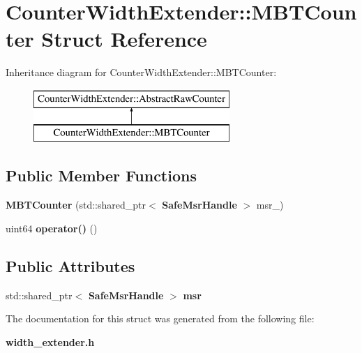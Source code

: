 \section{Counter\+Width\+Extender\+:\+:M\+B\+T\+Counter Struct Reference}
\label{structCounterWidthExtender_1_1MBTCounter}
Inheritance diagram for Counter\+Width\+Extender\+:\+:M\+B\+T\+Counter\+:\begin{figure}[H]
\begin{center}
\leavevmode
\includegraphics[height=2.000000cm]{structCounterWidthExtender_1_1MBTCounter}
\end{center}
\end{figure}
\subsection*{Public Member Functions}
\begin{DoxyCompactItemize}
\item 
\mbox{\label{structCounterWidthExtender_1_1MBTCounter_a68bea99ee05808321fb3422831e816e4}} 
{\bfseries M\+B\+T\+Counter} (std\+::shared\+\_\+ptr$<$ \textbf{ Safe\+Msr\+Handle} $>$ msr\+\_\+)
\item 
\mbox{\label{structCounterWidthExtender_1_1MBTCounter_a0d2b7e5e23c4a0b02a00d27080a37ae3}} 
uint64 {\bfseries operator()} ()
\end{DoxyCompactItemize}
\subsection*{Public Attributes}
\begin{DoxyCompactItemize}
\item 
\mbox{\label{structCounterWidthExtender_1_1MBTCounter_acd71c78ec1b5fd68ccdc6cbdd3713342}} 
std\+::shared\+\_\+ptr$<$ \textbf{ Safe\+Msr\+Handle} $>$ {\bfseries msr}
\end{DoxyCompactItemize}


The documentation for this struct was generated from the following file\+:\begin{DoxyCompactItemize}
\item 
\textbf{ width\+\_\+extender.\+h}\end{DoxyCompactItemize}
